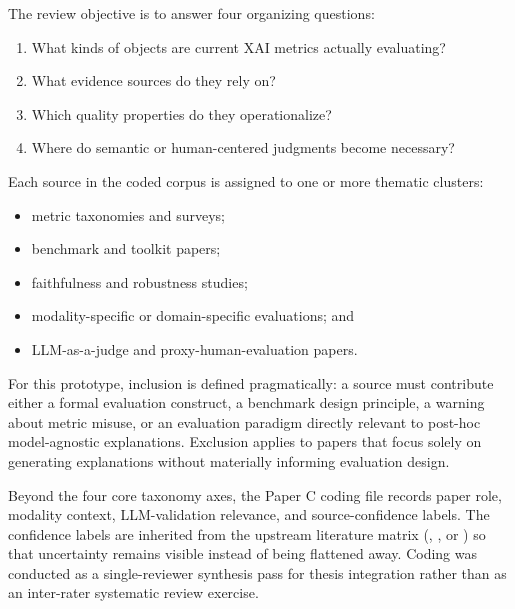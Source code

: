 \documentclass[twoside,11pt]{article}
\begin{document}
The review objective is to answer four organizing questions:
\begin{enumerate}[leftmargin=*]
\item What kinds of objects are current XAI metrics actually evaluating?
\item What evidence sources do they rely on?
\item Which quality properties do they operationalize?
\item Where do semantic or human-centered judgments become necessary?
\end{enumerate}

Each source in the coded corpus is assigned to one or more thematic
clusters:
\begin{itemize}[leftmargin=*]
\item metric taxonomies and surveys;
\item benchmark and toolkit papers;
\item faithfulness and robustness studies;
\item modality-specific or domain-specific evaluations; and
\item LLM-as-a-judge and proxy-human-evaluation papers.
\end{itemize}

For this prototype, inclusion is defined pragmatically: a source must
contribute either a formal evaluation construct, a benchmark design
principle, a warning about metric misuse, or an evaluation paradigm
directly relevant to post-hoc model-agnostic explanations. Exclusion
applies to papers that focus solely on generating explanations without
materially informing evaluation design.

Beyond the four core taxonomy axes, the Paper C coding file records
paper role, modality context, LLM-validation relevance, and
source-confidence labels. The confidence labels are inherited from the
upstream literature matrix (, , or
) so that uncertainty remains visible instead of being
flattened away. Coding was conducted as a single-reviewer synthesis pass
for thesis integration rather than as an inter-rater systematic review
exercise.
\end{document}
